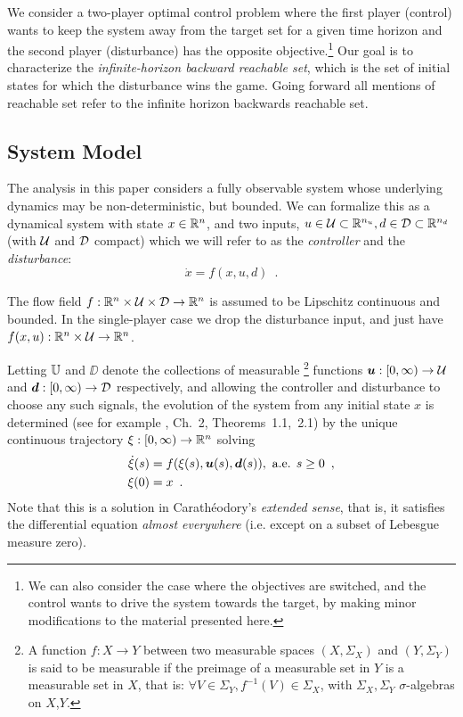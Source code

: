 
We consider a two-player optimal control problem where the first player (control) wants to keep the system away from the target set for a given time horizon and the second player (disturbance) has the opposite objective.\footnote{We can also consider the case where the objectives are switched, and the control wants to drive the system towards the target, by making minor modifications to the material presented here.} Our goal is to characterize the \emph{infinite-horizon backward reachable set}, which is the set of initial states for which the disturbance wins the game. Going forward all mentions of reachable set refer to the infinite horizon backwards reachable set.

\subsection{System Model \label{subsec:dynamics}}

The analysis in this paper considers a fully observable system whose underlying dynamics may be non-deterministic, but bounded. 
We can formalize this as a dynamical system with state $x\in\mathbb{R}^n$, and two inputs, $u\in\mathcal{U}\subset\mathbb{R}^{n_u},  d\in\mathcal{D}\subset\mathbb{R}^{n_d}$
(with $\mathcal{U}$ and $\mathcal{D}$ compact)
which we will refer to as the \emph{controller} and the \emph{disturbance}:
\begin{equation}\label{fxud}
\dot{x} = f(x,u, d) \enspace.
\end{equation}

The flow field $f: \mathbb{R}^n \times \mathcal{U} \times \mathcal{D}\rightarrow\mathbb{R}^n$ is assumed to be Lipschitz continuous and bounded. In the single-player case we drop the disturbance input, and just have ${f(x,u):\mathbb{R}^n \times \mathcal{U} \rightarrow\mathbb{R}^n}$.

Letting $\mathbb{U} $ and $\DD$ denote the collections of measurable%
	\footnote{A function $f:X\to Y$ between two measurable spaces $(X,\Sigma_X)$ and $(Y,\Sigma_Y)$
	is said to be measurable if the preimage of a measurable set in $Y$ is a measurable set in $X$, that is:
	$\forall V\in\Sigma_Y, f^{-1}(V)\in\Sigma_X$, with $\Sigma_X,\Sigma_Y$ $\sigma$-algebras on $X$,$Y$.}
functions $\bm u: [0,\infty)\to \mathcal{U} $ and $\bm d: [0,\infty)\to \mathcal{D}$ respectively,
and allowing the controller and disturbance to choose any such signals,
the evolution of the system
from any initial state $x$
is determined (see for example \cite{Coddington1955}, Ch.~2, Theorems~1.1,~2.1) by the unique continuous trajectory $\xi:[0,\infty)\to\mathbb{R}^n$ solving
\begin{equation}\label{eq:xdot}
\begin{split}
\dot{\xi}(s) &= f(\xi(s),\bm{u}(s),\bm{d}(s)), \text{ a.e. }s\ge 0 \enspace,\\
\xi(0) &= x \enspace.
\end{split}
\end{equation}
Note that this is a solution in Carath\'eodory's \emph{extended sense}, that is, it satisfies the differential equation \emph{almost everywhere} (i.e. except on a subset of Lebesgue measure zero).


